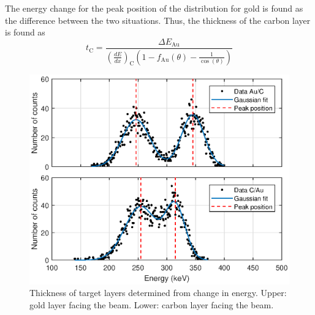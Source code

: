 The energy change for the peak position of the distribution for gold is found as the difference between the two situations. Thus, the thickness of the carbon layer is found as 
\begin{equation}
t_\mathrm{C} = \frac{\Delta E_{\mathrm{Au}}}{\left(\frac{dE}{dx}\right)_\mathrm{C} \left(1 - f_\mathrm{Au}(\theta) - \frac{1}{\cos(\theta)} \right)}
\end{equation}






\begin{figure}[t]
\centering
\includegraphics[width=0.99\columnwidth]{Dterminethicknessplot.eps}
\caption{Thickness of target layers determined from change in energy. Upper: gold layer facing the beam. Lower: carbon layer facing the beam.}
\label{fig_thickness}
\end{figure}



